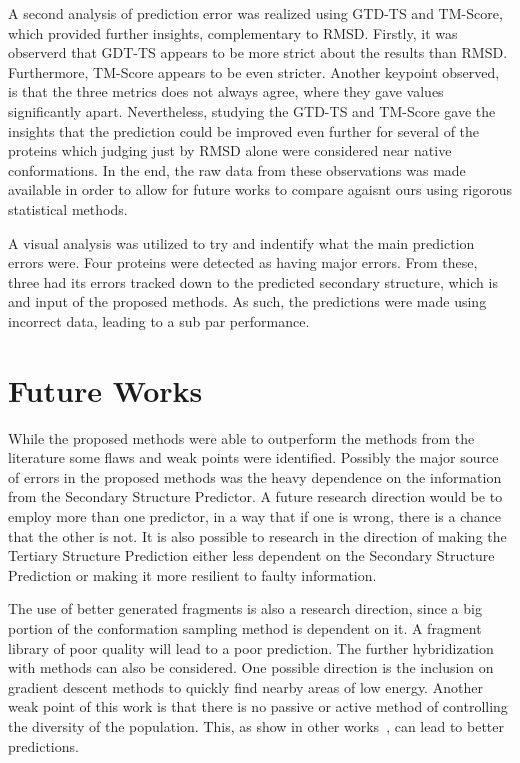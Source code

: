 A second analysis of prediction error was realized using GTD-TS and TM-Score,
which provided further insights, complementary to RMSD. Firstly, it was observerd
that GDT-TS appears to be more strict about the results than RMSD. Furthermore,
TM-Score appears to be even stricter. Another keypoint observed, is that the
three metrics does not always agree, where they gave values significantly
apart. Nevertheless, studying the GTD-TS and TM-Score gave the insights that
the prediction could be improved even further for several of the proteins which
judging just by RMSD alone were considered near native conformations. In the end,
the raw data from these observations was made available in order to allow for
future works to compare agaisnt ours using rigorous statistical methods.

A visual analysis was utilized to try and indentify what the main prediction
errors were. Four proteins were detected as having major errors. From these,
three had its errors tracked down to the predicted secondary structure, which is
and input of the proposed methods. As such, the predictions were made using
incorrect data, leading to a sub par performance.

\section{Future Works}\label{sec:future_works}

While the proposed methods were able to outperform the methods from the
literature some flaws and weak points were identified. Possibly the major
source of errors in the proposed methods was the heavy dependence on the
information from the Secondary Structure Predictor. A future research direction
would be to employ more than one predictor, in a way that if one is wrong,
there is a chance that the other is not. It is also possible to research in the
direction of making the Tertiary Structure Prediction either less dependent on
the Secondary Structure Prediction or making it more resilient to faulty
information.

The use of better generated fragments is also a research direction, since a big
portion of the conformation sampling method is dependent on it. A fragment
library of poor quality will lead to a poor prediction.
The further hybridization with methods can also be considered.  One possible
direction is the inclusion on gradient descent methods to quickly find nearby
areas of low energy.
Another weak point of this work is that there is no passive or active method of
controlling the diversity of the population. This, as show in other
works~\cite{narloch2016diversification,simoncini2017balancing}, can lead to
better predictions.

